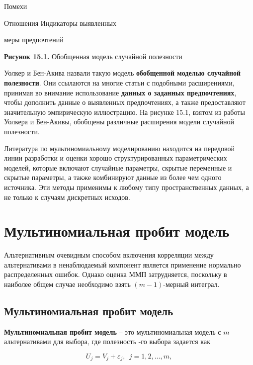                           Помехи



                          Отношения                           Индикаторы выявленных

меры           предпочтений



\textbf{Рисунок 15.1. }Обобщенная модель случайной полезности



Уолкер и Бен-Акива назвали такую модель \textbf{обобщенной моделью случайной полезности}. Они ссылаются на многие статьи с подобными расширениями, принимая во внимание использование \textbf{данных о заданных предпочтениях}, чтобы дополнить данные о выявленных предпочтениях, а также предоставляют значительную эмпирическую иллюстрацию. На рисунке 15.1, взятом из работы Уолкера и Бен-Акивы, обобщены различные расширения модели случайной полезности.

Литература по мультиномиальному моделированию находится на передовой линии разработки и оценки хорошо структурированных параметрических моделей, которые включают случайные параметры, скрытые переменные и скрытые параметры, а также комбинируют данные из более чем одного источника. Эти методы применимы к любому типу пространственных данных, а не только к случаям дискретных исходов.

\section{Мультиномиальная пробит модель}

Альтернативным очевидным способом включения корреляции между альтернативами в ненаблюдаемый компонент является применение нормально распределенных ошибок. Однако оценка ММП затрудняется, поскольку в наиболее общем случае необходимо взять $(m-1)$-мерный интеграл.

\subsection{Мультиномиальная пробит модель}

\textbf{Мультиномиальная пробит модель }-- это мультиномиальная модель с $m$ альтернативами для выбора, где полезность -го выбора задается как

\begin{equation} \label{GrindEQ__15_45_} U_j=V_j+{\varepsilon }_j,\ \ j=1,2,\dots ,m, \end{equation} 

